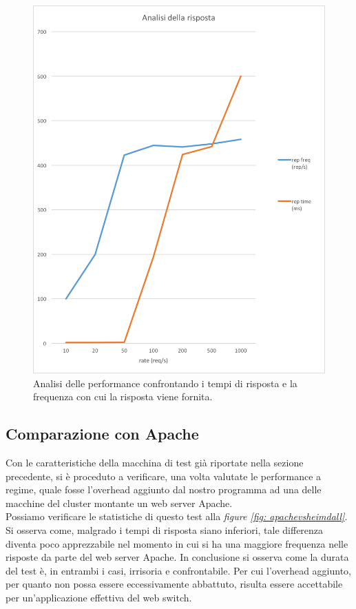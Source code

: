 \documentclass[italian]{tktltiki2}
\begin{document}
\begin{figure}[H]
\centering
\includegraphics[width=\textwidth]{images/repvsfreq}
\caption{Analisi delle performance confrontando i tempi di risposta e la frequenza con cui la risposta viene fornita.\label{fig: repvsfreq}}
\end{figure}\subsection{Comparazione con Apache}
Con le caratteristiche della macchina di test già riportate nella sezione precedente, si è proceduto a verificare, una volta valutate le performance a regime, quale fosse l'overhead aggiunto dal nostro programma ad una delle macchine del cluster montante un web server Apache. \\
Possiamo verificare le statistiche di questo test alla \emph{figure \ref{fig: apachevsheimdall}}. Si osserva come, malgrado i tempi di risposta siano inferiori, tale differenza diventa poco apprezzabile nel momento in cui si ha una maggiore frequenza nelle risposte da parte del web server Apache. In conclusione si osserva come la durata del test è, in entrambi i casi, irrisoria e confrontabile. Per cui l'overhead aggiunto, per quanto non possa essere eccessivamente abbattuto, risulta essere accettabile per un'applicazione effettiva del web switch.
\end{document}
